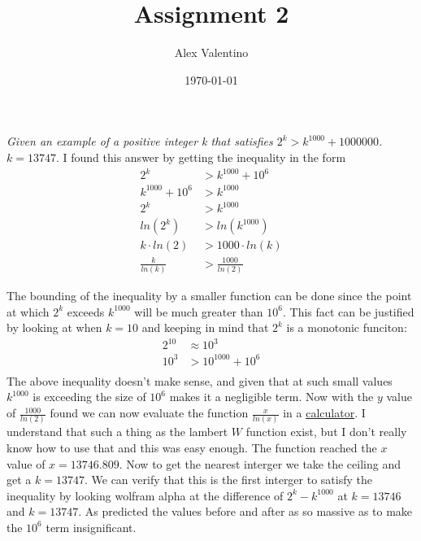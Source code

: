 \documentclass[12pt, letterpaper]{article}
\date{\today}
\author{Alex Valentino}
\title{Assignment 2}
\begin{document}
	\textit{Given an example of a positive integer k that satisfies $2^k > k^{1000} + 1000000$.}\\
	$k=13747.$  I found this answer by getting the inequality in the form 
\begin{align*}
	2^k & > k^{1000} + 10^6\\
	k^{1000}+ 10^6 & > k^{1000}\\
	2^k & > k^{1000}\\
	ln(2^k) & > ln(k^1000)\\
	k\cdot ln(2) & > 1000\cdot ln(k)\\
	\displaystyle \frac{k}{ln(k)} & > \frac{1000}{ln(2)}	
\end{align*}

	The bounding of the inequality by a smaller function can be done since the point at which $2^k$ exceeds $k^{1000}$ will be much greater than $10^6$.  This fact can be justified by looking at when $k=10$ and keeping in mind that $2^k$ is a monotonic funciton: 
	\begin{align*}
		2^{10} & \approx 10^3\\
		10^3 &> 10^{1000} + 10^6\\
	\end{align*}
	The above inequality doesn't make sense, and given that at such small values $k^{1000}$ is exceeding the size of $10^6$ makes it a negligible term.  Now with the $y$ value of $\frac{1000}{ln(2)}$ found we can now evaluate the function $\frac{x}{ln(x)}$ in a \href{https://www.desmos.com/calculator/en9glvnqyz}{calculator}.  I understand that such a thing as the lambert $W$ function exist, but I don't really know how to use that and this was easy enough.  The function reached the $x$ value of $x=13746.809.$  Now to get the nearest interger we take the ceiling and get a $k=13747.$  We can verify that this is the first interger to satisfy the inequality by looking wolfram alpha at the difference of $2^k - k^{1000}$ at \href{https://www.wolframalpha.com/input?i2d=true&i=k%3D13746%3B+Power%5B2%2Ck%5D-Power%5Bk%2C1000%5D}{$k=13746$} and \href{https://www.wolframalpha.com/input?i2d=true&i=k%3D13747%3B+Power%5B2%2Ck%5D-Power%5Bk%2C1000%5D}{$k=13747$}.  As predicted the values before and after as so massive as to make the $10^6$ term insignificant.  
\end{document}
